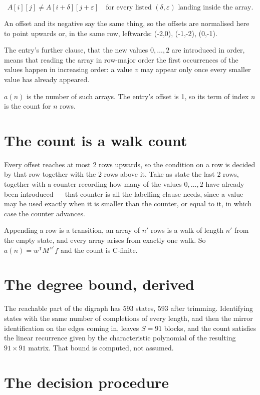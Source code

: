 \documentclass[11pt]{article}
\theoremstyle{definition}
\begin{document}
\[A[i][j] \ne A[i{+}\delta][j{+}\varepsilon]\quad\text{for every listed }(\delta,\varepsilon)\text{ landing inside the array.}\]

An offset and its negative say the same thing, so the offsets are normalised here to point upwards or, in the same row, leftwards: (-2,0), (-1,-2), (0,-1).

The entry's further clause, that the new values $0,\dots,2$ are introduced in order, means that reading the array in row-major order the first occurrences of the values happen in increasing order: a value $v$ may appear only once every smaller value has already appeared.

$a(n)$ is the number of such arrays. The entry's offset is 1, so its term of index $n$ is the count for $n$ rows.

\section{The count is a walk count}

Every offset reaches at most $2$ rows upwards, so the condition on a row is decided by that row together with the $2$ rows above it. Take as state the last $2$ rows, together with a counter recording how many of the values $0,\dots,2$ have already been introduced --- that counter is all the labelling clause needs, since a value may be used exactly when it is smaller than the counter, or equal to it, in which case the counter advances.

Appending a row is a transition, an array of $n'$ rows is a walk of length $n'$ from the empty state, and every array arises from exactly one walk. So $a(n) = w^{\mathsf T}M^{\,n'}f$ and the count is C-finite.

\section{The degree bound, derived}

The reachable part of the digraph has $593$ states, $593$ after trimming. Identifying states with the same number of completions of every length, and then the mirror identification on the edges coming in, leaves $S = 91$ blocks, and the count satisfies the linear recurrence given by the characteristic polynomial of the resulting $91\times91$ matrix. That bound is computed, not assumed.

\section{The decision procedure}
\end{document}
